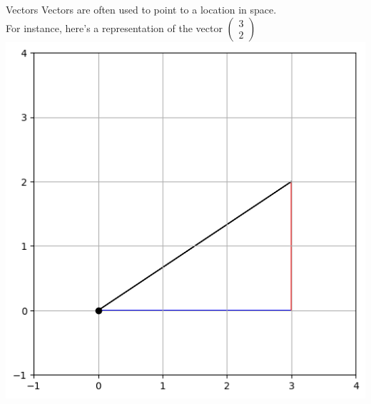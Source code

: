 \documentclass{beamer}
\begin{document}
\begin{frame}{Vectors}
    Vectors are often used to point to a location in space.\\
    For instance, here's a representation of the vector $\begin{pmatrix}
        3 \\ 2
    \end{pmatrix}$
    \centering
    \includegraphics[scale=0.4]{images/vectorgrid.png}
\end{frame}
\end{document}
